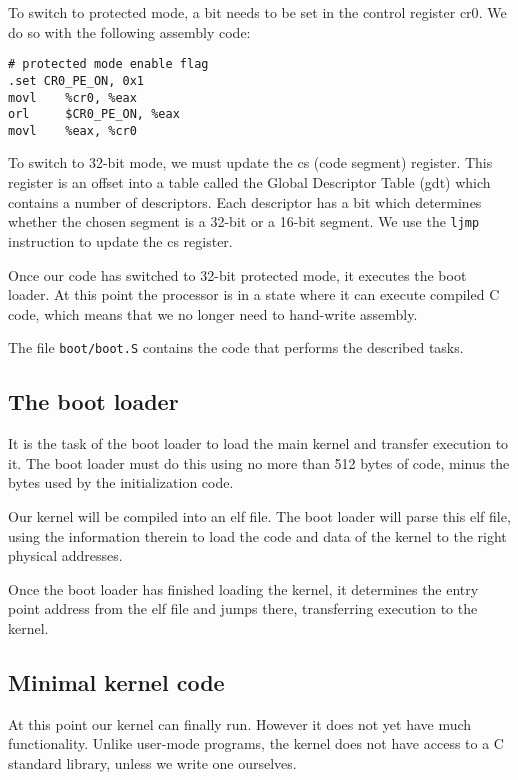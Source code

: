 \documentclass{article}
\begin{document}
To switch to protected mode, a bit needs to be set in the control register
\gls{cr0}. We do so with the following assembly code:
\begin{verbatim}
# protected mode enable flag
.set CR0_PE_ON, 0x1 
movl    %cr0, %eax
orl     $CR0_PE_ON, %eax
movl    %eax, %cr0
\end{verbatim}

To switch to 32-bit mode, we must update the \gls{cs} (code
segment) register. This register is an offset into a table called the Global
Descriptor Table (\gls{gdt}) which contains a number of descriptors. Each
descriptor has a bit which determines whether the chosen segment is a 32-bit
or a 16-bit segment. We use the \texttt{ljmp} instruction to update the
\gls{cs} register.

Once our code has switched to 32-bit protected mode, it executes the boot
loader. At this point the processor is in a state where it can execute
compiled C code, which means that we no longer need to hand-write assembly.

The file \texttt{boot/boot.S} contains the code that performs the described
tasks.



\subsection{The boot loader}
It is the task of the boot loader to load the main kernel and transfer
execution to it. The boot loader must do this using no more than 512 bytes of
code, minus the bytes used by the initialization code.

Our kernel will be compiled into an \gls{elf} file. The boot loader will parse
this \gls{elf} file, using the information therein to load the code and data
of the kernel to the right physical addresses.


Once the boot loader has finished loading the kernel, it determines the entry
point address from the \gls{elf} file and jumps there, transferring execution to the
kernel.

\subsection{Minimal kernel code}
At this point our kernel can finally run. However it does not yet have much
functionality. Unlike user-mode programs, the kernel does not have access to a
C standard library, unless we write one ourselves.
\end{document}
